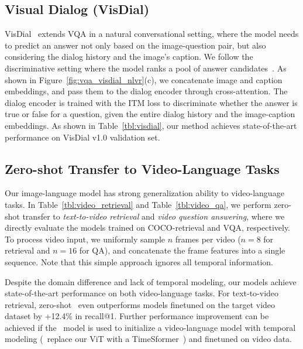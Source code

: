 \vspace{-1ex}
\subsection{Visual Dialog (VisDial)}
\vspace{-0.5ex}
VisDial~\cite{VisDial} extends VQA in a natural conversational setting,
where the model needs to predict an answer not only based on the image-question pair, but also considering the dialog history and the image's caption.
We follow the discriminative setting where the model ranks a pool of answer candidates~\cite{ReDAN,VD-BERT,visdial_eccv}.
As shown in Figure~\ref{fig:vqa_visdial_nlvr}(c),
we concatenate image and caption embeddings,
and pass them to the dialog encoder through cross-attention.
The dialog encoder is trained with the ITM loss to discriminate whether the answer is true or false for a question,
given the entire dialog history and the image-caption embeddings.
As shown in Table~\ref{tbl:visdial},
our method achieves state-of-the-art performance on VisDial v1.0 validation set.

\vspace{-1ex}
\subsection{Zero-shot Transfer to Video-Language Tasks}
\vspace{-0.5ex}





Our image-language model has strong generalization ability to video-language tasks.
In Table~\ref{tbl:video_retrieval} and Table~\ref{tbl:video_qa},
we perform zero-shot transfer to \textit{text-to-video retrieval} and \textit{video question answering},
where we directly evaluate the models trained on COCO-retrieval and VQA, respectively.
To process video input,
we uniformly sample $n$ frames per video ($n=8$ for retrieval and $n=16$ for QA),
and concatenate the frame features into a single sequence.
Note that this simple approach ignores all temporal information.

Despite the domain difference and lack of temporal modeling,
our models achieve state-of-the-art performance on both video-language tasks.
For text-to-video retrieval,
zero-shot \name~even outperforms models finetuned on the target video dataset by +12.4\% in recall@1.
Further performance improvement can be achieved if the \name~model is used to initialize a video-language model with temporal modeling (\eg~replace our ViT with a TimeSformer~\cite{timesformer}) and finetuned on video data.



